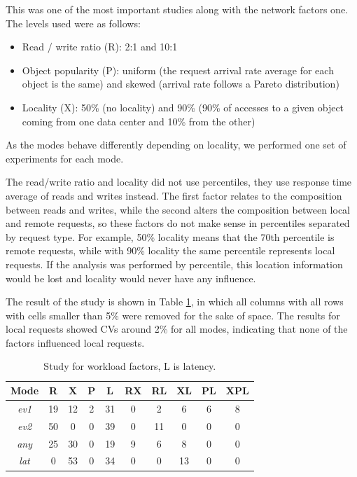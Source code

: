 \documentclass[doublespacing]{bmcart}
\begin{document}
This was one of the most important studies along with the network factors one.
The levels used were as follows:

\begin{itemize}

\item Read / write ratio (R): 2:1 and 10:1

\item Object popularity (P): uniform (the request arrival rate average for each
object is the same) and skewed (arrival rate follows a Pareto
distribution)

\item Locality (X): 50\% (no locality) and 90\% (90\% of accesses to a given
object coming from one data center and 10\% from the other)

\end{itemize}

As the modes behave differently depending on locality, we performed one set of experiments for each mode.

The read/write ratio and locality did not use percentiles, they use response
time average of reads and writes instead. The first factor
relates to the composition between reads and writes, while the second alters the
composition between local and remote requests, so these factors do not make
sense in percentiles separated by request type. For example, 50\% locality means
that the 70th percentile is remote requests, while with 90\% locality the same
percentile represents local requests. If the analysis was performed by
percentile, this location information would be lost and locality would never
have any influence.

The result of the study is shown in Table
\ref{tab:estudo_para_fatores_de_carga_de_trabalho}, in which all columns with
all rows with cells smaller than 5\% were removed for the sake of space. The results for local
requests showed CVs around 2\% for all modes, indicating that none of the
factors influenced local requests.

\begin{table}[h!]
\caption{Study for workload factors, L is latency.}
\begin{tabular}{cccccccccc} \hline

Mode & R & X & P & L & RX & RL & XL & PL & XPL\\\hline

\textit{ev1} & 19 & 12 & 2 & 31 & 0 & 2 & 6 & 6 & 8\\

\textit{ev2} & 50 & 0 & 0 & 39 & 0 & 11 & 0 & 0 & 0\\

\textit{any} & 25 & 30 & 0 & 19 & 9 & 6 & 8 & 0 & 0\\

\textit{lat} & 0 & 53 & 0 & 34 & 0 & 0 & 13 & 0 & 0\\\hline

\end{tabular} 
\label{tab:estudo_para_fatores_de_carga_de_trabalho}
\end{table}
\end{document}
